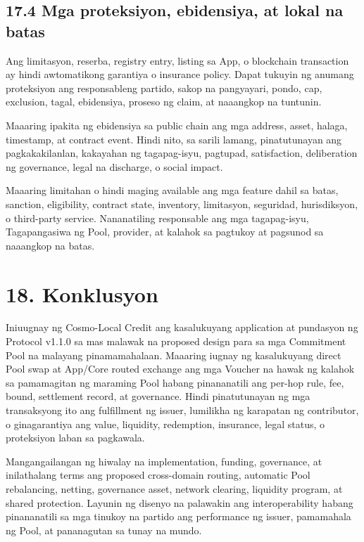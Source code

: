\documentclass[11pt]{article}
\begin{document}
\subsection*{17.4 Mga proteksiyon, ebidensiya, at lokal na batas}

Ang limitasyon, reserba, registry entry, listing sa App, o blockchain transaction ay hindi awtomatikong garantiya o insurance policy. Dapat tukuyin ng anumang proteksiyon ang responsableng partido, sakop na pangyayari, pondo, cap, exclusion, tagal, ebidensiya, proseso ng claim, at naaangkop na tuntunin.

Maaaring ipakita ng ebidensiya sa public chain ang mga address, asset, halaga, timestamp, at contract event. Hindi nito, sa sarili lamang, pinatutunayan ang pagkakakilanlan, kakayahan ng tagapag-isyu, pagtupad, satisfaction, deliberation ng governance, legal na discharge, o social impact.

Maaaring limitahan o hindi maging available ang mga feature dahil sa batas, sanction, eligibility, contract state, inventory, limitasyon, seguridad, hurisdiksyon, o third-party service. Nananatiling responsable ang mga tagapag-isyu, Tagapangasiwa ng Pool, provider, at kalahok sa pagtukoy at pagsunod sa naaangkop na batas.


\section*{18. Konklusyon}

Iniuugnay ng Cosmo-Local Credit ang kasalukuyang application at pundasyon ng Protocol v1.1.0 sa mas malawak na proposed design para sa mga Commitment Pool na malayang pinamamahalaan. Maaaring iugnay ng kasalukuyang direct Pool swap at App/Core routed exchange ang mga Voucher na hawak ng kalahok sa pamamagitan ng maraming Pool habang pinananatili ang per-hop rule, fee, bound, settlement record, at governance. Hindi pinatutunayan ng mga transaksyong ito ang fulfillment ng issuer, lumilikha ng karapatan ng contributor, o ginagarantiya ang value, liquidity, redemption, insurance, legal status, o proteksiyon laban sa pagkawala.

Mangangailangan ng hiwalay na implementation, funding, governance, at inilathalang terms ang proposed cross-domain routing, automatic Pool rebalancing, netting, governance asset, network clearing, liquidity program, at shared protection. Layunin ng disenyo na palawakin ang interoperability habang pinananatili sa mga tinukoy na partido ang performance ng issuer, pamamahala ng Pool, at pananagutan sa tunay na mundo.
\end{document}
